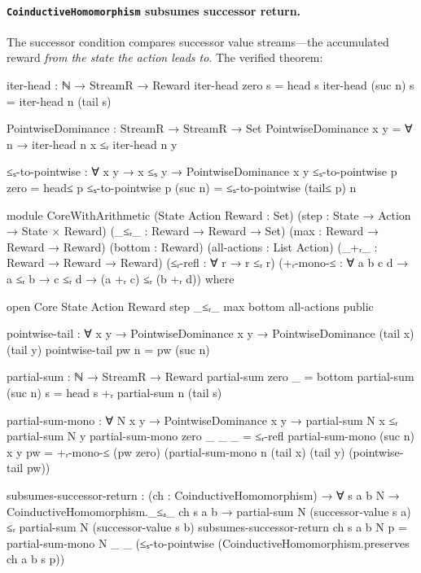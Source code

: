 \documentclass[runningheads]{llncs}
\begin{document}
\paragraph{\texttt{CoinductiveHomomorphism} subsumes successor return.}  The successor condition compares successor value streams---the accumulated reward \emph{from the state the action leads to}.  The verified theorem:

\begin{code}[hide]
  iter-head : ℕ → StreamR → Reward
  iter-head zero    s = head s
  iter-head (suc n) s = iter-head n (tail s)

  PointwiseDominance : StreamR → StreamR → Set
  PointwiseDominance x y = ∀ n → iter-head n x ≤ᵣ iter-head n y

  ≤ₛ-to-pointwise : ∀ {x y} → x ≤ₛ y → PointwiseDominance x y
  ≤ₛ-to-pointwise p zero    = head≤ p
  ≤ₛ-to-pointwise p (suc n) = ≤ₛ-to-pointwise (tail≤ p) n
\end{code}

\begin{code}[hide]
module CoreWithArithmetic
  (State Action Reward : Set)
  (step                : State → Action → State × Reward)
  (_≤ᵣ_                : Reward → Reward → Set)
  (max                 : Reward → Reward → Reward)
  (bottom              : Reward)
  (all-actions         : List Action)
  (_+ᵣ_                : Reward → Reward → Reward)
  (≤ᵣ-refl             : ∀ {r} → r ≤ᵣ r)
  (+ᵣ-mono-≤           : ∀ {a b c d} → a ≤ᵣ b → c ≤ᵣ d → (a +ᵣ c) ≤ᵣ (b +ᵣ d))
  where

  open Core State Action Reward step _≤ᵣ_ max bottom all-actions public

  pointwise-tail : ∀ {x y} → PointwiseDominance x y → PointwiseDominance (tail x) (tail y)
  pointwise-tail pw n = pw (suc n)

  partial-sum : ℕ → StreamR → Reward
  partial-sum zero    _ = bottom
  partial-sum (suc n) s = head s +ᵣ partial-sum n (tail s)

  partial-sum-mono : ∀ N x y → PointwiseDominance x y →
                     partial-sum N x ≤ᵣ partial-sum N y
  partial-sum-mono zero _ _ _ = ≤ᵣ-refl
  partial-sum-mono (suc n) x y pw =
    +ᵣ-mono-≤ (pw zero) (partial-sum-mono n (tail x) (tail y) (pointwise-tail pw))
\end{code}

\begin{code}[hide]
  subsumes-successor-return : (ch : CoinductiveHomomorphism) →
    ∀ s a b N →
    CoinductiveHomomorphism._≤ₐ_ ch s a b →
    partial-sum N (successor-value s a) ≤ᵣ
    partial-sum N (successor-value s b)
  subsumes-successor-return ch s a b N p =
    partial-sum-mono N _ _ (≤ₛ-to-pointwise
      (CoinductiveHomomorphism.preserves ch a b s p))
\end{code}
\end{document}
